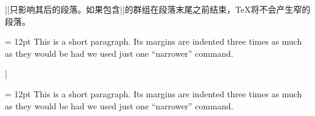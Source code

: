 %


|\narrower|只影响其后的段落。如果包含|\narrower|的群组在段落末尾之前结束，\TeX{}将不会产生窄的段落。

\example
{\parindent = 12pt \narrower\narrower\narrower
This is a short paragraph. Its margins are indented
three times as much as they would be
had we used just one ``narrower'' command.\par}
|
\produces
{\parindent = 12pt \narrower\narrower\narrower
This is a short paragraph. Its margins are indented
three times as much as they would be
had we used just one ``narrower'' command.\par}
\endexample\enddesc

